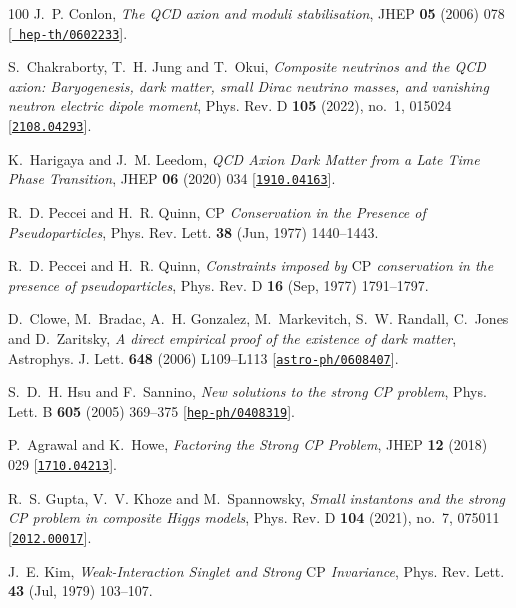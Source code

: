 \begin{thebibliography}{100}
J.~P. Conlon,  {\em {The QCD axion and moduli stabilisation}}, JHEP {\bf 05}
  (2006) 078 [\href{http://www.arXiv.org/abs/hep-th/0602233}{{\tt
  hep-th/0602233}}].

S.~Chakraborty, T.~H. Jung and T.~Okui,  {\em {Composite neutrinos and the QCD
  axion: Baryogenesis, dark matter, small Dirac neutrino masses, and vanishing
  neutron electric dipole moment}}, Phys. Rev. D {\bf 105} (2022), no.~1,
  015024 [\href{http://www.arXiv.org/abs/2108.04293}{{\tt 2108.04293}}].

K.~Harigaya and J.~M. Leedom,  {\em {QCD Axion Dark Matter from a Late Time
  Phase Transition}}, JHEP {\bf 06} (2020) 034
  [\href{http://www.arXiv.org/abs/1910.04163}{{\tt 1910.04163}}].

R.~D. Peccei and H.~R. Quinn,  {\em $\mathrm{CP}$ Conservation in the Presence
  of Pseudoparticles}, Phys. Rev. Lett. {\bf 38} (Jun, 1977) 1440--1443.

R.~D. Peccei and H.~R. Quinn,  {\em Constraints imposed by $\mathrm{CP}$
  conservation in the presence of pseudoparticles}, Phys. Rev. D {\bf 16} (Sep,
  1977) 1791--1797.

D.~Clowe, M.~Bradac, A.~H. Gonzalez, M.~Markevitch, S.~W. Randall, C.~Jones and
  D.~Zaritsky,  {\em {A direct empirical proof of the existence of dark
  matter}}, Astrophys. J. Lett. {\bf 648} (2006) L109--L113
  [\href{http://www.arXiv.org/abs/astro-ph/0608407}{{\tt astro-ph/0608407}}].

S.~D.~H. Hsu and F.~Sannino,  {\em {New solutions to the strong CP problem}},
  Phys. Lett. B {\bf 605} (2005) 369--375
  [\href{http://www.arXiv.org/abs/hep-ph/0408319}{{\tt hep-ph/0408319}}].

P.~Agrawal and K.~Howe,  {\em {Factoring the Strong CP Problem}}, JHEP {\bf 12}
  (2018) 029 [\href{http://www.arXiv.org/abs/1710.04213}{{\tt 1710.04213}}].

R.~S. Gupta, V.~V. Khoze and M.~Spannowsky,  {\em {Small instantons and the
  strong CP problem in composite Higgs models}}, Phys. Rev. D {\bf 104} (2021),
  no.~7, 075011 [\href{http://www.arXiv.org/abs/2012.00017}{{\tt 2012.00017}}].

J.~E. Kim,  {\em Weak-Interaction Singlet and Strong $\mathrm{CP}$ Invariance},
  Phys. Rev. Lett. {\bf 43} (Jul, 1979) 103--107.


\end{thebibliography}

